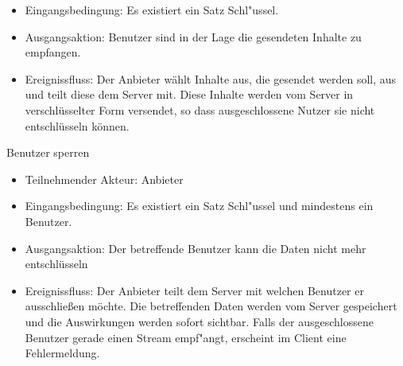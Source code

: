 \documentclass[a4paper,10pt]{scrartcl}
\begin{document}
\begin{usecase}
{\begin{itemize}
   \item Eingangsbedingung: Es existiert ein Satz Schl"ussel.
   \item Ausgangsaktion: Benutzer sind in der Lage die gesendeten Inhalte zu empfangen.
   \item Ereignissfluss: Der Anbieter wählt Inhalte aus, die gesendet werden soll, aus und
         teilt diese dem Server mit. Diese Inhalte werden vom Server in verschlüsselter Form
         versendet, so dass ausgeschlossene Nutzer sie nicht entschlüsseln können.
   \end{itemize}
}
 {Benutzer sperren
   \begin{itemize}
   \item Teilnehmender Akteur: Anbieter
   \item Eingangsbedingung: Es existiert ein Satz Schl"ussel und mindestens ein Benutzer.
   \item Ausgangsaktion: Der betreffende Benutzer kann die Daten nicht mehr entschlüsseln
   \item Ereignissfluss: Der Anbieter teilt dem Server mit welchen Benutzer er ausschließen möchte.
         Die betreffenden Daten werden vom Server gespeichert und die Auswirkungen werden
         sofort sichtbar. Falls der ausgeschlossene Benutzer gerade einen Stream empf"angt,
         erscheint im Client eine Fehlermeldung.
   \end{itemize}
}
\end{usecase}
\clearpage
\end{document}
